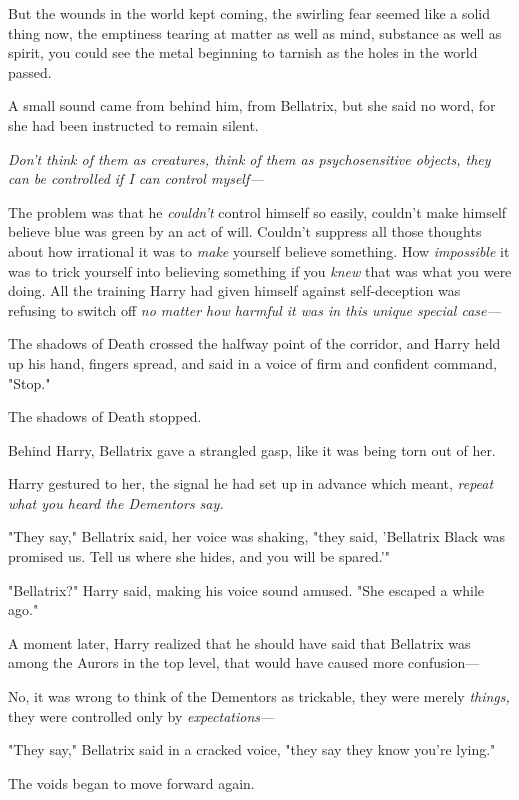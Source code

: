But the wounds in the world kept coming, the swirling fear seemed like a solid 
thing now, the emptiness tearing at matter as well as mind, substance as well 
as spirit, you could see the metal beginning to tarnish as the holes in the 
world passed.

A small sound came from behind him, from Bellatrix, but she said no word, for 
she had been instructed to remain silent.

\emph{Don't think of them as creatures, think of them as psychosensitive 
objects, they can be controlled if I can control myself---}

The problem was that he \emph{couldn't} control himself so easily, couldn't 
make himself believe blue was green by an act of will. Couldn't suppress all 
those thoughts about how irrational it was to \emph{make} yourself believe 
something. How \emph{impossible} it was to trick yourself into believing 
something if you \emph{knew} that was what you were doing. All the training 
Harry had given himself against self-deception was refusing to switch off 
\emph{no matter how harmful it was in this unique special case---}

The shadows of Death crossed the halfway point of the corridor, and Harry held 
up his hand, fingers spread, and said in a voice of firm and confident command, 
"Stop."

The shadows of Death stopped.

Behind Harry, Bellatrix gave a strangled gasp, like it was being torn out of 
her.

Harry gestured to her, the signal he had set up in advance which meant, 
\emph{repeat what you heard the Dementors say.}

"They say," Bellatrix said, her voice was shaking, "they said, 'Bellatrix Black 
was promised us. Tell us where she hides, and you will be spared.'"

"Bellatrix?" Harry said, making his voice sound amused. "She escaped a while 
ago."

A moment later, Harry realized that he should have said that Bellatrix was 
among the Aurors in the top level, that would have caused more confusion---

No, it was wrong to think of the Dementors as trickable, they were merely 
\emph{things,} they were controlled only by \emph{expectations---}

"They say," Bellatrix said in a cracked voice, "they say they know you're 
lying."

The voids began to move forward again.

